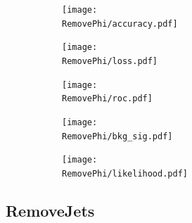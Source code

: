 \documentclass[../../main/main.tex]{subfiles}
\begin{document}
\begin{figure}[H]
  \centering
  \begin{subfigure}[t]{0.5\textwidth}
    \centering
    \texttt{[image: \\RemovePhi/accuracy.pdf]}
    \caption{\captionAcc}
    \label{fig:RemovePhi_acc}
  \end{subfigure}
  \vspace{0.01cm}
  \begin{subfigure}[t]{0.5\textwidth}
    \centering
    \texttt{[image: \\RemovePhi/loss.pdf]}
    \caption{\captionLoss}
    \label{fig:RemovePhi_loss}
  \end{subfigure}
  \begin{subfigure}[t]{0.5\textwidth}
    \centering
    \texttt{[image: \\RemovePhi/roc.pdf]}
    \caption{\captionROC}
    \label{fig:RemovePhi_roc}
  \end{subfigure}
  \caption{}
  \label{fig:RemovePhi_1}  
\end{figure}

\begin{figure}[H]
  \centering
  \begin{subfigure}[t]{0.5\textwidth}
    \centering
    \texttt{[image: \\RemovePhi/bkg\_sig.pdf]}
    \caption{\captionBkgSig}    
    \label{fig:RemovePhi_bkg_sig}
  \end{subfigure}
  \vspace{0.01cm}
  \begin{subfigure}[t]{0.5\textwidth}
    \centering
    \texttt{[image: \\RemovePhi/likelihood.pdf]}
    \caption{\captionLik}    
    \label{fig:RemovePhi_likelihood}
  \end{subfigure}
  \caption{}
  \label{fig:RemovePhi_Z}
\end{figure}

\subsection{RemoveJets}
\label{sec:fillzero}
\end{document}
